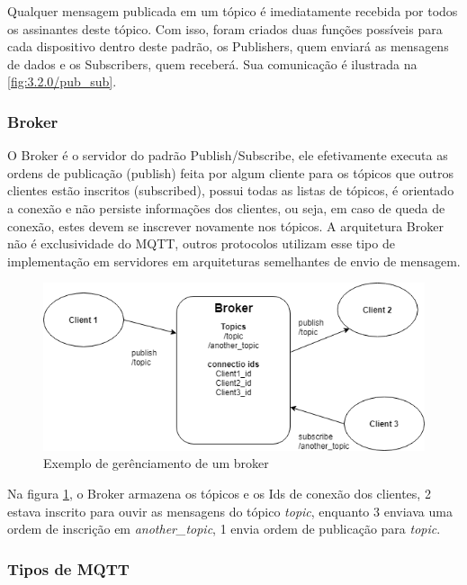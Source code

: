 Qualquer mensagem publicada em um tópico é imediatamente recebida por todos os assinantes deste tópico. Com isso, foram criados duas funções possíveis para cada dispositivo dentro deste padrão, os Publishers, quem enviará as mensagens de dados e os Subscribers, quem receberá. Sua comunicação é ilustrada na \ref{fig:3.2.0/pub_sub}.

\subsubsection{Broker}
\label{subsubsection:broker}

O Broker é o servidor do padrão Publish/Subscribe, ele efetivamente executa as ordens de publicação (publish) feita por algum cliente para os tópicos que outros clientes estão inscritos (subscribed), possui todas as listas de tópicos, é orientado a conexão e não persiste informações dos clientes, ou seja, em caso de queda de conexão, estes devem se inscrever novamente nos tópicos.  A arquitetura Broker não é exclusividade do MQTT, outros protocolos utilizam esse tipo de implementação em servidores em arquiteturas semelhantes de envio de mensagem.

\begin{figure}[h]
\centering
\includegraphics[width=12cm]{./02_Capitulos/02_Cap3/figures/broker_pub_sub}
\caption{Exemplo de gerênciamento de um broker}
\label{fig:3.2.0/broker_pub_sub}
\end{figure}

Na figura \ref{fig:3.2.0/broker_pub_sub}, o Broker armazena os tópicos e os Ids de conexão dos clientes, 2 estava inscrito para ouvir as mensagens do tópico \textit{topic}, enquanto 3 enviava uma ordem de inscrição em \textit{another\_topic}, 1 envia ordem de publicação para \textit{topic}.


\subsubsection{Tipos de MQTT}
\label{subsubsection:tipos_mqtt}

